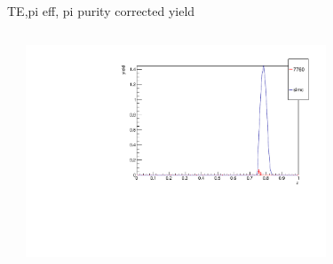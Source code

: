 \begin{frame}{TE,pi eff, pi purity corrected yield}
\begin{columns}
\begin{column}[T]{0.5\textwidth}
\end{column}
\begin{column}[T]{0.5\textwidth}
\includegraphics[width = 0.7\textwidth]{results/yield/check/yieldcheck_490_pos.pdf}
\end{column}
\end{columns}
\end{frame}
